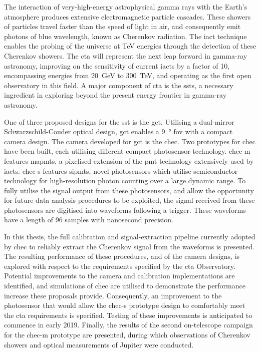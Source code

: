 The interaction of very-high-energy astrophysical gamma rays with the Earth's atmosphere produces extensive electromagnetic particle cascades. These showers of particles travel faster than the speed of light in air, and consequently emit photons of blue wavelength, known as Cherenkov radiation. The \gls{iact} technique enables the probing of the universe at \si{TeV} energies through the detection of these Cherenkov showers. The \gls{cta} will represent the next leap forward in gamma-ray astronomy, improving on the sensitivity of current \glspl{iact} by a factor of 10, encompassing energies from \SI{20}{GeV} to \SI{300}{TeV}, and operating as the first open observatory in this field. A major component of \gls{cta} is the \glspl{sst}, a necessary ingredient in exploring beyond the present energy frontier in gamma-ray astronomy.

One of three proposed designs for the \gls{sst} is the \gls{gct}. Utilising a dual-mirror Schwarzschild-Couder optical design, \gls{gct} enables a \SI{9}{\degree} \gls{fov} with a compact camera design. The camera developed for \gls{gct} is the \gls{chec}. Two prototypes for \gls{chec} have been built, each utilising different compact photosensor technology. \gls{chec-m} features \glspl{mapmt}, a pixelised extension of the \gls{pmt} technology extensively used by \glspl{iact}. \mbox{\gls{chec-s}} features \glspl{sipmt}, novel photosensors which utilise semiconductor technology for high-resolution photon counting over a large dynamic range. To fully utilise the signal output from these photosensors, and allow the opportunity for future data analysis procedures to be exploited, the signal received from these photosensors are digitised into waveforms following a trigger. These waveforms have a length of 96 samples with nanosecond precision.

In this thesis, the full calibration and signal-extraction pipeline currently adopted by \gls{chec} to reliably extract the Cherenkov signal from the waveforms is presented. The resulting performance of these procedures, and of the camera designs, is explored with respect to the requirements specified by the \gls{cta} Observatory. Potential improvements to the camera and calibration implementations are identified, and simulations of \gls{chec} are utilised to demonstrate the performance increase these proposals provide. Consequently, an improvement to the photosensor that would allow the \gls{chec-s} prototype design to comfortably meet the \gls{cta} requirements is specified. Testing of these improvements is anticipated to commence in early 2019. Finally, the results of the second on-telescope campaign for the \gls{chec-m} prototype are presented, during which observations of Cherenkov showers and optical measurements of Jupiter were conducted.